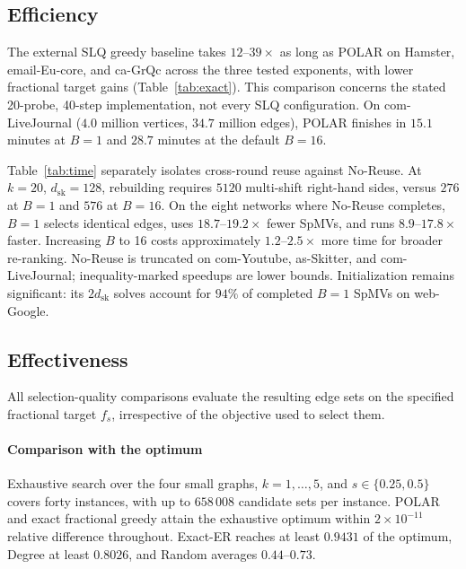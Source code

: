 \documentclass[conference]{IEEEtran}
\theoremstyle{definition}
\newcommand{\POLAR}{\textsc{POLAR}}
\newcommand{\dsk}{d_{\mathrm{sk}}}
\begin{document}
\subsection{Efficiency}
\label{sec:exp-efficiency}
The external SLQ greedy baseline takes $12$--$39\times$ as long as
\POLAR{} on Hamster, email-Eu-core, and ca-GrQc across the three
tested exponents, with lower fractional target gains
(Table~\ref{tab:exact}). This comparison concerns the stated
20-probe, 40-step implementation, not every SLQ configuration.
On com-LiveJournal ($4.0$ million vertices, $34.7$ million edges),
\POLAR{} finishes in $15.1$ minutes at $B=1$ and $28.7$ minutes at
the default $B=16$.

Table~\ref{tab:time} separately isolates cross-round reuse against
No-Reuse. At $k=20$, $\dsk=128$, rebuilding requires $5120$
multi-shift right-hand sides, versus $276$ at $B=1$ and $576$ at
$B=16$. On the eight networks where No-Reuse completes, $B=1$
selects identical edges, uses $18.7$--$19.2\times$ fewer SpMVs,
and runs $8.9$--$17.8\times$ faster. Increasing $B$ to 16 costs
approximately $1.2$--$2.5\times$ more time for broader re-ranking.
No-Reuse is truncated on com-Youtube, as-Skitter, and com-LiveJournal;
inequality-marked speedups are lower bounds. Initialization remains
significant: its $2\dsk$ solves account for $94\%$ of completed
$B=1$ SpMVs on web-Google.

\subsection{Effectiveness}
All selection-quality comparisons evaluate the resulting edge sets on
the specified fractional target $f_s$, irrespective of the objective
used to select them.

\paragraph{Comparison with the optimum}
Exhaustive search over the four small graphs, $k=1,\ldots,5$, and
$s\in\{0.25,0.5\}$ covers forty instances, with up to $658\,008$
candidate sets per instance. \POLAR{} and exact fractional greedy
attain the exhaustive optimum within $2\times10^{-11}$ relative
difference throughout. Exact-ER reaches at least $0.9431$ of the
optimum, Degree at least $0.8026$, and Random averages $0.44$--$0.73$.
\end{document}
